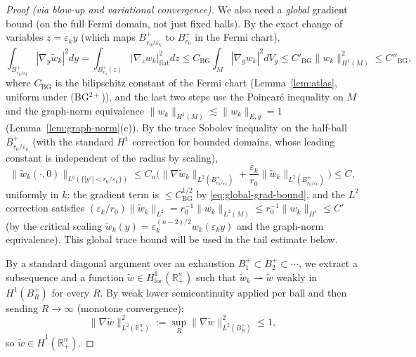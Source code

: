 \documentclass[10pt,a4paper]{amsart}
\newcommand{\R}{\mathbb{R}}
\begin{document}
\begin{proof}[Proof (via blow-up and variational convergence)]
We also need a \emph{global} gradient bound (on the full Fermi domain, not just fixed balls).
By the exact change of variables $z=\varepsilon_k y$ (which maps $B_{r_0/\varepsilon_k}^+$ to
$B_{r_0}^+$ in the Fermi chart),
\begin{equation}\label{eq:global-grad-bound}
\int_{B_{r_0/\varepsilon_k}^+}|\nabla_y\widetilde w_k|^2dy
=\int_{B_{r_0}^+(z)}|\nabla_z w_k|^2_{\mathrm{flat}}dz
\le C_{\mathrm{BG}}\int_M|\nabla_g w_k|^2dV_g
\le C'_{\mathrm{BG}}\|w_k\|_{H^1(M)}^2\le C''_{\mathrm{BG}},
\end{equation}
where $C_{\mathrm{BG}}$ is the bilipschitz constant of the Fermi chart
(Lemma~\ref{lem:atlas}, uniform under \textup{(BG$^{2+}$)}),
and the last two steps use the Poincar\'e inequality on $M$
and the graph-norm equivalence
$\|w_k\|_{H^1(M)}\lesssim \|w_k\|_{E,g}=1$
(Lemma~\ref{lem:graph-norm}(c)).
By the trace Sobolev inequality on the half-ball $B_{r_0/\varepsilon_k}^+$
(with the standard $H^1$ correction for bounded domains,
whose leading constant is independent of the radius by scaling),
\begin{equation}\label{eq:global-trace-bound}
\|\widetilde w_k(\cdot,0)\|_{L^q(\{|y'|<r_0/\varepsilon_k\})}
\le C_n\Big(\|\nabla\widetilde w_k\|_{L^2(B_{r_0/\varepsilon_k}^+)}
+\frac{\varepsilon_k}{r_0}\|\widetilde w_k\|_{L^2(B_{r_0/\varepsilon_k}^+)}\Big)
\le C,
\end{equation}
uniformly in $k$: the gradient term is $\le C_{\mathrm{BG}}^{1/2}$ by \eqref{eq:global-grad-bound},
and the $L^2$ correction satisfies
$(\varepsilon_k/r_0)\|\widetilde w_k\|_{L^2}
=r_0^{-1}\|w_k\|_{L^2(M)}\le r_0^{-1}\|w_k\|_{H^1}\le C'$
(by the critical scaling $\widetilde w_k(y)=\varepsilon_k^{(n-2)/2}w_k(\varepsilon_k y)$
and the graph-norm equivalence).
This global trace bound will be used in the tail estimate below.

By a standard diagonal argument over an exhaustion
$B_1^+\subset B_2^+\subset\cdots$,
we extract a subsequence and a function
$\widetilde w\in H^1_{\mathrm{loc}}(\R^n_+)$ such that
$\widetilde w_k\rightharpoonup\widetilde w$
weakly in $H^1(B_R^+)$ for every $R$.
By weak lower semicontinuity applied per ball and then
sending $R\to\infty$ (monotone convergence):
\begin{equation}\label{eq:wlimit-gradient-bound}
\|\nabla\widetilde w\|_{L^2(\R^n_+)}^2
:=\sup_R\|\nabla\widetilde w\|_{L^2(B_R^+)}^2
\le1,
\end{equation}
so $\widetilde w\in\dot H^1(\R^n_+)$.


\end{proof}
\end{document}
